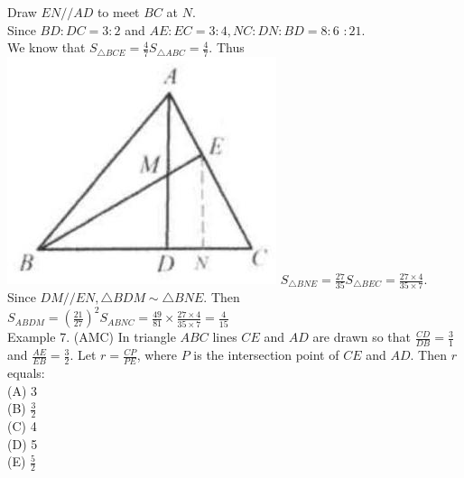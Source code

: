 \documentclass[10pt]{article}
\begin{document}
Draw \(E N / / A D\) to meet \(B C\) at \(N\).\\
Since \(B D: D C=3: 2\) and \(A E: E C=3: 4, N C: D N: B D=8: 6\) \(: 21\).\\
We know that \(S_{\triangle B C E}=\frac{4}{7} S_{\triangle A B C}=\frac{4}{7}\). Thus\\
\includegraphics[max width=\textwidth]{2025_04_17_97bc1f7e44d93c271a88g-107(2)} \(S_{\triangle B N E}=\frac{27}{35} S_{\triangle B E C}=\frac{27 \times 4}{35 \times 7}\).\\
Since \(D M / / E N, \triangle B D M \sim \triangle B N E\). Then \(S_{A B D M}=\left(\frac{21}{27}\right)^{2} S_{A B N C}=\frac{49}{81} \times \frac{27 \times 4}{35 \times 7}=\frac{4}{15}\)\\
Example 7. (AMC) In triangle \(A B C\) lines \(C E\) and \(A D\) are drawn so that \(\frac{C D}{D B}=\frac{3}{1}\) and \(\frac{A E}{E B}=\frac{3}{2}\). Let \(r=\frac{C P}{P E}\), where \(P\) is the intersection point of \(C E\) and \(A D\). Then \(r\) equals:\\
(A) 3\\
(B) \(\frac{3}{2}\)\\
(C) 4\\
(D) 5\\
(E) \(\frac{5}{2}\)\\
\end{document}
